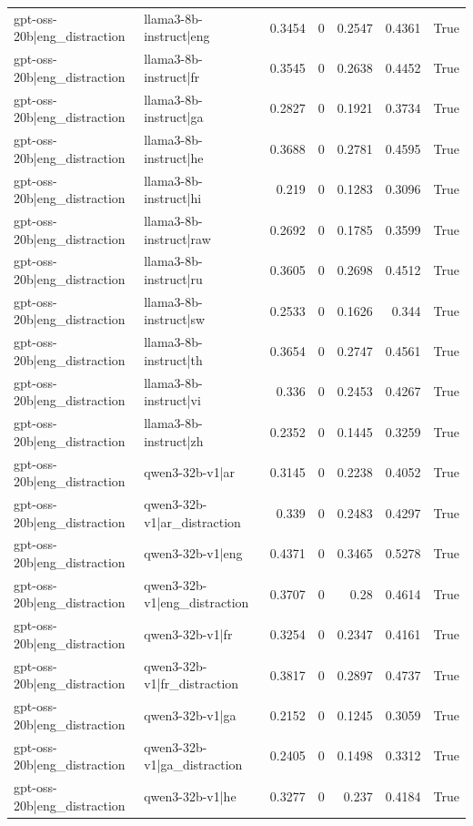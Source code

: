 \begin{table}
\begin{tabular}{l l r r r r l}
gpt-oss-20b|eng_distraction & llama3-8b-instruct|eng & 0.3454 & 0 & 0.2547 & 0.4361 & True \\
gpt-oss-20b|eng_distraction & llama3-8b-instruct|fr & 0.3545 & 0 & 0.2638 & 0.4452 & True \\
gpt-oss-20b|eng_distraction & llama3-8b-instruct|ga & 0.2827 & 0 & 0.1921 & 0.3734 & True \\
gpt-oss-20b|eng_distraction & llama3-8b-instruct|he & 0.3688 & 0 & 0.2781 & 0.4595 & True \\
gpt-oss-20b|eng_distraction & llama3-8b-instruct|hi & 0.219 & 0 & 0.1283 & 0.3096 & True \\
gpt-oss-20b|eng_distraction & llama3-8b-instruct|raw & 0.2692 & 0 & 0.1785 & 0.3599 & True \\
gpt-oss-20b|eng_distraction & llama3-8b-instruct|ru & 0.3605 & 0 & 0.2698 & 0.4512 & True \\
gpt-oss-20b|eng_distraction & llama3-8b-instruct|sw & 0.2533 & 0 & 0.1626 & 0.344 & True \\
gpt-oss-20b|eng_distraction & llama3-8b-instruct|th & 0.3654 & 0 & 0.2747 & 0.4561 & True \\
gpt-oss-20b|eng_distraction & llama3-8b-instruct|vi & 0.336 & 0 & 0.2453 & 0.4267 & True \\
gpt-oss-20b|eng_distraction & llama3-8b-instruct|zh & 0.2352 & 0 & 0.1445 & 0.3259 & True \\
gpt-oss-20b|eng_distraction & qwen3-32b-v1|ar & 0.3145 & 0 & 0.2238 & 0.4052 & True \\
gpt-oss-20b|eng_distraction & qwen3-32b-v1|ar_distraction & 0.339 & 0 & 0.2483 & 0.4297 & True \\
gpt-oss-20b|eng_distraction & qwen3-32b-v1|eng & 0.4371 & 0 & 0.3465 & 0.5278 & True \\
gpt-oss-20b|eng_distraction & qwen3-32b-v1|eng_distraction & 0.3707 & 0 & 0.28 & 0.4614 & True \\
gpt-oss-20b|eng_distraction & qwen3-32b-v1|fr & 0.3254 & 0 & 0.2347 & 0.4161 & True \\
gpt-oss-20b|eng_distraction & qwen3-32b-v1|fr_distraction & 0.3817 & 0 & 0.2897 & 0.4737 & True \\
gpt-oss-20b|eng_distraction & qwen3-32b-v1|ga & 0.2152 & 0 & 0.1245 & 0.3059 & True \\
gpt-oss-20b|eng_distraction & qwen3-32b-v1|ga_distraction & 0.2405 & 0 & 0.1498 & 0.3312 & True \\
gpt-oss-20b|eng_distraction & qwen3-32b-v1|he & 0.3277 & 0 & 0.237 & 0.4184 & True \\

\end{tabular}
\end{table}
